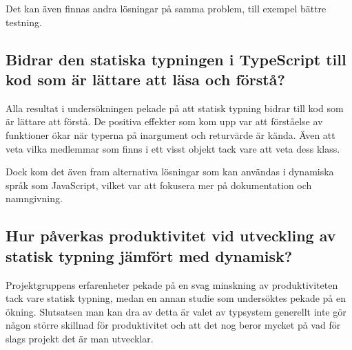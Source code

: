 Det kan även finnas andra lösningar på samma problem, till exempel bättre testning.
\subsection{Bidrar den statiska typningen i TypeScript till kod som är lättare att läsa och förstå?}
Alla resultat i undersökningen pekade på att statisk typning bidrar till kod som är lättare att förstå. De positiva effekter som kom upp var att förståelse av funktioner ökar när typerna på inargument och returvärde är kända. Även att veta vilka medlemmar som finns i ett visst objekt tack vare att veta dess klass.

Dock kom det även fram alternativa lösningar som kan användas i dynamiska språk som JavaScript, vilket var att fokusera mer på dokumentation och namngivning.
\subsection{Hur påverkas produktivitet vid utveckling av statisk typning jämfört med dynamisk?}
Projektgruppens erfarenheter pekade på en svag minskning av produktiviteten tack vare statisk typning, medan en annan studie som undersöktes pekade på en ökning. Slutsatsen man kan dra av detta är valet av typsystem generellt inte gör någon större skillnad för produktivitet och att det nog beror mycket på vad för slags projekt det är man utvecklar.
